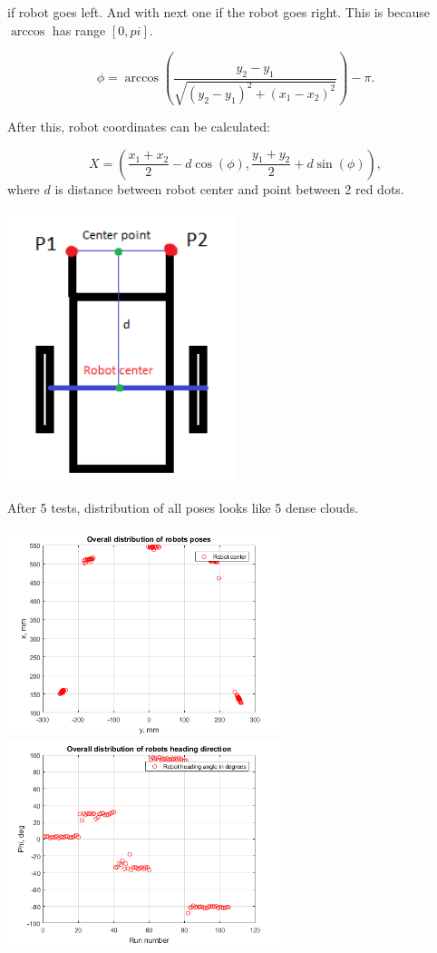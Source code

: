 \documentclass[a4paper, 12pt]{article}
\begin{document}
if robot goes left. And with next one if the robot goes right. This is because $\arccos$ has range $[0, pi]$.

\begin{equation}
\phi = \arccos(\frac{y_2-y_1}{\sqrt{(y_2-y_1)^2+(x_1-x_2)^2}})-\pi.
\end{equation}

After this, robot coordinates can be calculated:

\begin{equation}
X = (\frac{x_1+x_2}{2}-d \cos(\phi),\frac{y_1+y_2}{2}+d \sin(\phi)),
\end{equation}
where $d$ is distance between robot center and point between 2 red dots.

\begin{center}
  \includegraphics[width=0.5\textwidth]{pose}
\end{center}
\newpage


After 5 tests, distribution of all poses looks like 5 dense clouds.


\begin{center}
  \includegraphics[width=0.6\textwidth]{all}
  \includegraphics[width=0.6\textwidth]{allphi}
\end{center}
\end{document}
